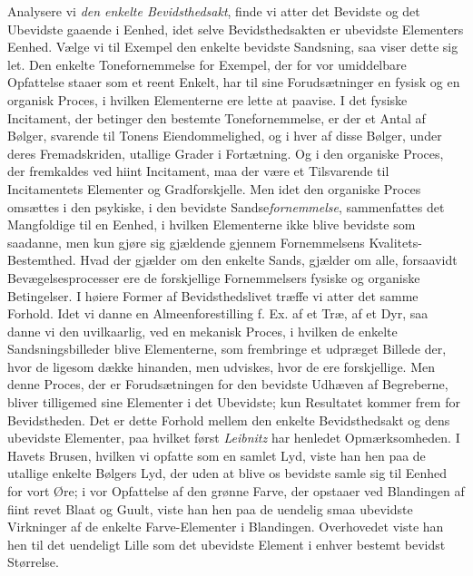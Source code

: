 \documentclass[12pt,a4paper,openany]{book}
\newcommand{\opage}[1]{\marginnote{\footnotesize\textit{[#1]}}}
\begin{document}
Analysere vi \emph{den enkelte Bevidsthedsakt}, finde vi
atter det Bevidste og det Ubevidste gaaende i Eenhed, idet
selve Bevidsthedsakten er ubevidste Elementers Eenhed. Vælge
vi til Exempel den enkelte bevidste Sandsning, saa viser dette
sig let. Den enkelte Tonefornemmelse for Exempel, der for
vor umiddelbare Opfattelse staaer som et reent Enkelt, har
til sine Forudsætninger en fysisk og en organisk Proces, i
hvilken Elementerne ere lette at paavise. I det fysiske Incitament,
der betinger den bestemte Tonefornemmelse, er der et
Antal af Bølger, svarende til Tonens Eiendommelighed, og
i hver af disse Bølger, under deres Fremadskriden, utallige
Grader i Fortætning. Og i den organiske Proces, der fremkaldes
ved hiint Incitament, maa der være et Tilsvarende til
Incitamentets Elementer og Gradforskjelle. Men idet den
organiske Proces omsættes i den psykiske, i den bevidste Sandse\emph{fornemmelse},
sammenfattes det Mangfoldige til en Eenhed,
i hvilken Elementerne ikke blive bevidste som saadanne, men
kun gjøre sig gjældende gjennem Fornemmelsens Kvalitets-Bestemthed.
Hvad der gjælder om den enkelte Sands, gjælder
om alle, forsaavidt Bevægelsesprocesser ere de forskjellige
Fornemmelsers fysiske og organiske Betingelser. I høiere
\opage{50}Former af Bevidsthedslivet træffe vi atter det samme Forhold.
Idet vi danne en Almeenforestilling f. Ex. af et Træ, af et
Dyr, saa danne vi den uvilkaarlig, ved en mekanisk Proces,
i hvilken de enkelte Sandsningsbilleder blive Elementerne,
som frembringe et udpræget Billede der, hvor de ligesom dække
hinanden, men udviskes, hvor de ere forskjellige. Men denne
Proces, der er Forudsætningen for den bevidste Udhæven af
Begreberne, bliver tilligemed sine Elementer i det Ubevidste;
kun Resultatet kommer frem for Bevidstheden. Det er dette
Forhold mellem den enkelte Bevidsthedsakt og dens ubevidste
Elementer, paa hvilket først \emph{Leibnitz} har henledet Opmærksomheden.
I Havets Brusen, hvilken vi opfatte som en samlet
Lyd, viste han hen paa de utallige enkelte Bølgers Lyd, der
uden at blive os bevidste samle sig til Eenhed for vort Øre;
i vor Opfattelse af den grønne Farve, der opstaaer ved
Blandingen af fiint revet Blaat og Guult, viste han hen
paa de uendelig smaa ubevidste Virkninger af de enkelte
Farve-Elementer i Blandingen. Overhovedet viste han hen til
det uendeligt Lille som det ubevidste Element i enhver bestemt
bevidst Størrelse.
\end{document}
